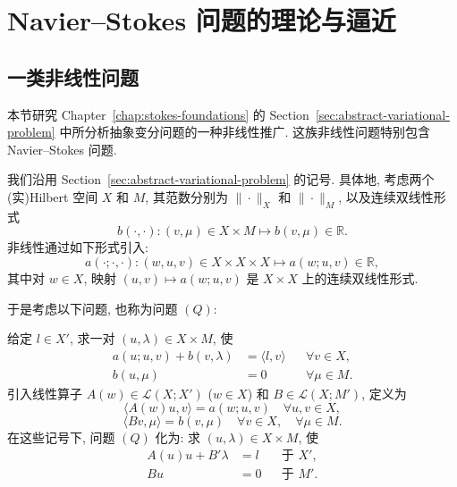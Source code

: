 \makeatletter
\gdef\@chapapp{\chaptername}
\gdef\thechapter{\arabic{chapter}}
\gdef\theHchapter{\arabic{chapter}}
\gdef\Hy@chapapp{chapter}
\makeatother
{}
\setcounter{chapter}{3}
\chapter{Navier--Stokes 问题的理论与逼近}
\label{chap:navier-stokes-theory-approx}
\renewcommand{\thesection}{\arabic{section}}
\renewcommand{\thesubsection}{\thesection.\arabic{subsection}}
\renewcommand{\theequation}{\thesection.\arabic{equation}}
\renewcommand{\thestatement}{\thesection.\arabic{statement}}

\section{一类非线性问题}
\label{sec:navier-stokes-nonlinear-problems}
\setcounter{equation}{0}
\setcounter{statement}{0}

本节研究 Chapter~\ref{chap:stokes-foundations} 的
Section~\ref{sec:abstract-variational-problem} 中所分析抽象变分问题的一种非线性推广.
这族非线性问题特别包含 Navier--Stokes 问题.

我们沿用 Section~\ref{sec:abstract-variational-problem} 的记号.
具体地, 考虑两个(实)Hilbert 空间 $X$ 和 $M$,
其范数分别为 $\|\cdot\|_X$ 和 $\|\cdot\|_M$, 以及连续双线性形式
\[
b(\cdot,\cdot):(v,\mu)\in X\times M
\longmapsto b(v,\mu)\in\mathbb R.
\]
非线性通过如下形式引入:
\[
a(\cdot;\cdot,\cdot):(w,u,v)\in X\times X\times X
\longmapsto a(w;u,v)\in\mathbb R,
\]
其中对 $w\in X$, 映射 $(u,v)\mapsto a(w;u,v)$ 是 $X\times X$ 上的连续双线性形式.

于是考虑以下问题, 也称为问题 $(Q)$:

给定 $l\in X'$, 求一对 $(u,\lambda)\in X\times M$, 使
\begin{align}
a(u;u,v)+b(v,\lambda)&=\langle l,v\rangle
&&\forall v\in X,\label{eq:navier-abstract-q-first}\\
b(u,\mu)&=0
&&\forall\mu\in M.\label{eq:navier-abstract-q-second}
\end{align}
引入线性算子 $A(w)\in\mathcal L(X;X')$ ($w\in X$) 和
$B\in\mathcal L(X;M')$, 定义为
\[
\langle A(w)u,v\rangle=a(w;u,v)
\quad\forall u,v\in X,
\]
\[
\langle Bv,\mu\rangle=b(v,\mu)
\quad\forall v\in X,\quad\forall\mu\in M.
\]
在这些记号下, 问题 $(Q)$ 化为: 求 $(u,\lambda)\in X\times M$, 使
\begin{align}
A(u)u+B'\lambda&=l&&\text{于 }X',\label{eq:navier-abstract-q-operator-first}\\
Bu&=0&&\text{于 }M'.\label{eq:navier-abstract-q-operator-second}
\end{align}

